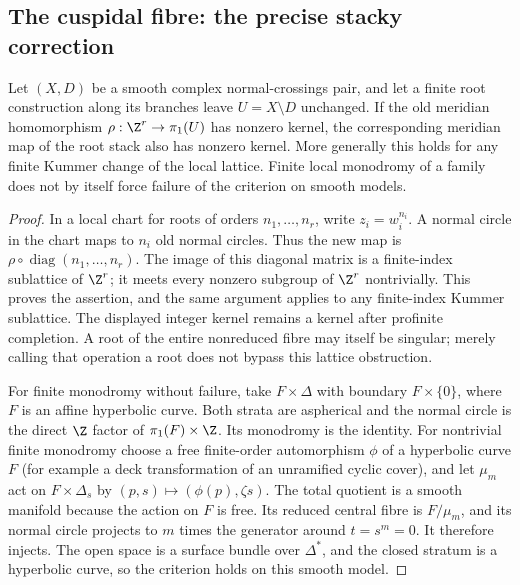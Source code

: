 \subsection{The cuspidal fibre: the precise stacky correction}

\begin{proposition}\label{P1e-roots}
Let $(X,D)$ be a smooth complex normal-crossings pair, and let a finite root
construction along its branches leave $U=X\setminus D$ unchanged.
If the old meridian homomorphism $\rho:\Z^r\to\pi_1(U)$ has nonzero kernel,
the corresponding meridian map of the root stack also has nonzero kernel.
More generally this holds for any finite Kummer change of the local lattice.
Finite local monodromy of a family does not by itself force failure of the
criterion on smooth models.
\end{proposition}
\begin{proof}
In a local chart for roots of orders $n_1,\ldots,n_r$, write $z_i=w_i^{n_i}$.
A normal circle in the chart maps to $n_i$ old normal circles.  Thus the new
map is $\rho\circ\operatorname{diag}(n_1,\ldots,n_r)$.  The image of this
diagonal matrix is a finite-index sublattice of $\Z^r$; it meets every nonzero
subgroup of $\Z^r$ nontrivially.  This proves the assertion, and the same
argument applies to any finite-index Kummer sublattice.  The displayed integer
kernel remains a kernel after profinite completion.  A root of the entire
nonreduced fibre may itself be singular; merely calling that operation a root
does not bypass this lattice obstruction.

For finite monodromy without failure, take $F\times\Delta$ with boundary
$F\times\{0\}$, where $F$ is an affine hyperbolic curve.  Both strata are
aspherical and the normal circle is the direct $\Z$ factor of
$\pi_1(F)\times\Z$.  Its monodromy is the identity.  For nontrivial finite
monodromy choose a free finite-order automorphism $\phi$ of a hyperbolic curve
$F$ (for example a deck transformation of an unramified cyclic cover), and
let $\mu_m$ act on $F\times\Delta_s$ by $(p,s)\mapsto(\phi(p),\zeta s)$.
The total quotient is a smooth manifold because the action on $F$ is free.
Its reduced central fibre is $F/\mu_m$, and its normal circle projects to
$m$ times the generator around $t=s^m=0$.  It therefore injects.  The open
space is a surface bundle over $\Delta^*$, and the closed stratum is a
hyperbolic curve, so the criterion holds on this smooth model.
\end{proof}

